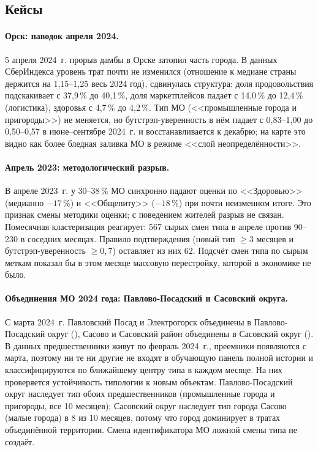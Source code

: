 \documentclass[11pt,a4paper]{article}
\newcommand{\code}[1]{\path{#1}}
\begin{document}
\subsection{Кейсы}\label{sec:cases}

\paragraph{Орск: паводок апреля 2024.} 5 апреля 2024~г. прорыв дамбы в Орске затопил часть города. В данных СберИндекса уровень трат почти не изменился (отношение к медиане страны держится на 1,15--1,25 весь 2024 год), сдвинулась структура: доля продовольствия подскакивает с 37,9\,\% до 40,1\,\%, доля маркетплейсов падает с 14,0\,\% до 12,4\,\% (логистика), здоровья с 4,7\,\% до 4,2\,\%. Тип МО (<<промышленные города и пригороды>>) не меняется, но бутстрэп-уверенность в нём падает с 0,83--1,00 до 0,50--0,57 в июне--сентябре 2024~г. и восстанавливается к декабрю; на карте это видно как более бледная заливка МО в режиме <<слой неопределённости>>.

\paragraph{Апрель 2023: методологический разрыв.} В апреле 2023~г. у 30--38\,\% МО синхронно падают оценки по <<Здоровью>> (медианно $-17$\,\%) и <<Общепиту>> ($-18$\,\%) при почти неизменном итоге. Это признак смены методики оценки; с поведением жителей разрыв не связан. Помесячная кластеризация реагирует: 567 сырых смен типа в апреле против 90--230 в соседних месяцах. Правило подтверждения (новый тип $\ge 3$ месяцев и бутстрэп-уверенность $\ge 0{,}7$) оставляет из них 62. Подсчёт смен типа по сырым меткам показал бы в этом месяце массовую перестройку, которой в экономике не было.

\paragraph{Объединения МО 2024 года: Павлово-Посадский и Сасовский округа.} С марта 2024~г. Павловский Посад и Электрогорск объединены в Павлово-Посадский округ (\code{union_22}), Сасово и Сасовский район объединены в Сасовский округ (\code{union_23}). В данных предшественники живут по февраль 2024~г., преемники появляются с марта, поэтому ни те ни другие не входят в обучающую панель полной истории и классифицируются по ближайшему центру типа в каждом месяце. На них проверяется устойчивость типологии к новым объектам. Павлово-Посадский округ наследует тип обоих предшественников (промышленные города и пригороды, все 10 месяцев); Сасовский округ наследует тип города Сасово (малые города) в 8 из 10 месяцев, потому что город доминирует в тратах объединённой территории. Смена идентификатора МО ложной смены типа не создаёт.
\end{document}
